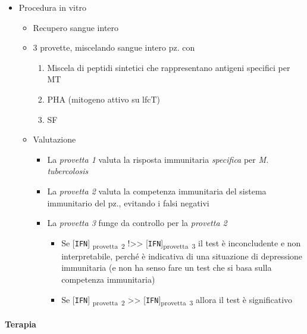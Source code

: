 \documentclass[italian,]{article}
\providecommand{\tightlist}{%
  \setlength{\itemsep}{0pt}\setlength{\parskip}{0pt}}
\begin{document}
\begin{itemize}
\tightlist
\item
  Procedura in vitro

  \begin{itemize}
  \tightlist
  \item
    Recupero sangue intero
  \item
    3 provette, miscelando sangue intero pz. con

    \begin{enumerate}
    \def\labelenumi{\arabic{enumi}.}
    \tightlist
    \item
      Miscela di peptidi sintetici che rappresentano antigeni specifici
      per MT
    \item
      PHA (mitogeno attivo su lfcT)
    \item
      SF
    \end{enumerate}
  \item
    Valutazione

    \begin{itemize}
    \tightlist
    \item
      La \emph{provetta 1} valuta la risposta immunitaria
      \emph{specifica} per \emph{M. tubercolosis}
    \item
      La \emph{provetta 2} valuta la competenza immunitaria del sistema
      immunitario del pz., evitando i falsi negativi
    \item
      La \emph{provetta 3} funge da controllo per la \emph{provetta 2}

      \begin{itemize}
      \tightlist
      \item
        Se {[}\texttt{IFN}{]} \textsubscript{provetta~2}
        !\textgreater{}\textgreater{}
        {[}\texttt{IFN}{]}\textsubscript{provetta~3} il test è
        inconcludente e non interpretabile, perché è indicativa di una
        situazione di depressione immunitaria (e non ha senso fare un
        test che si basa sulla competenza immunitaria)
      \item
        Se {[}\texttt{IFN}{]} \textsubscript{provetta~2}
        \textgreater{}\textgreater{}
        {[}\texttt{IFN}{]}\textsubscript{provetta~3} allora il test è
        significativo
      \end{itemize}
    \end{itemize}
  \end{itemize}
\end{itemize}

\hypertarget{terapia-1}{%
\paragraph{Terapia}\label{terapia-1}}
\end{document}
